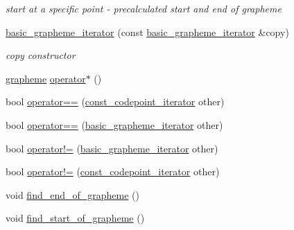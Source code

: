 \begin{DoxyCompactItemize}
\begin{DoxyCompactList}\small\item\em start at a specific point -\/ precalculated start and end of grapheme \end{DoxyCompactList}\item 
\hyperlink{classu5e_1_1basic__grapheme__iterator_a24ed7dcd80e07e3c1622622b6c2f9832}{basic\+\_\+grapheme\+\_\+iterator} (const \hyperlink{classu5e_1_1basic__grapheme__iterator}{basic\+\_\+grapheme\+\_\+iterator} \&copy)\hypertarget{classu5e_1_1basic__grapheme__iterator_a24ed7dcd80e07e3c1622622b6c2f9832}{}\label{classu5e_1_1basic__grapheme__iterator_a24ed7dcd80e07e3c1622622b6c2f9832}

\begin{DoxyCompactList}\small\item\em copy constructor \end{DoxyCompactList}\item 
\hyperlink{classu5e_1_1basic__grapheme__iterator_a7417c5ebb0987c2c74bcfe2cf1be0173}{grapheme} \hyperlink{classu5e_1_1basic__grapheme__iterator_a7c0c750b27aac7086b387b01aa09ca10}{operator$\ast$} ()
\item 
bool \hyperlink{classu5e_1_1basic__grapheme__iterator_af0143d8374632eafd9a326174de4485d}{operator==} (\hyperlink{classu5e_1_1basic__grapheme__iterator_a3fd90c1a24fccf790b94199950339846}{const\+\_\+codepoint\+\_\+iterator} other)
\item 
bool \hyperlink{classu5e_1_1basic__grapheme__iterator_a0e9990c4f8498d80501435af709c9471}{operator==} (\hyperlink{classu5e_1_1basic__grapheme__iterator}{basic\+\_\+grapheme\+\_\+iterator} other)
\item 
bool \hyperlink{classu5e_1_1basic__grapheme__iterator_a1395f7b6e67e1083d832ffb4ee7ff3a5}{operator!=} (\hyperlink{classu5e_1_1basic__grapheme__iterator}{basic\+\_\+grapheme\+\_\+iterator} other)
\item 
bool \hyperlink{classu5e_1_1basic__grapheme__iterator_aa19753607206c61237affaa45cf3aec4}{operator!=} (\hyperlink{classu5e_1_1basic__grapheme__iterator_a3fd90c1a24fccf790b94199950339846}{const\+\_\+codepoint\+\_\+iterator} other)
\end{DoxyCompactItemize}
{\bf }\par
\begin{DoxyCompactItemize}
\item 
void \hyperlink{classu5e_1_1basic__grapheme__iterator_a151a5acc48f8f928663b6135e77ada74}{find\+\_\+end\+\_\+of\+\_\+grapheme} ()
\item 
void \hyperlink{classu5e_1_1basic__grapheme__iterator_a2c2a4203e5255cb22c917298660bca90}{find\+\_\+start\+\_\+of\+\_\+grapheme} ()
\end{DoxyCompactItemize}

